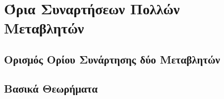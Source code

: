 \documentclass[a4paper,11pt]{report}
\begin{document}
\chapter{Όρια Συναρτήσεων Πολλών Μεταβλητών}

\section{Ορισμός Ορίου Συνάρτησης δύο Μεταβλητών}

\vspace{\baselineskip}




  \section{Βασικά Θεωρήματα}
\end{document}
